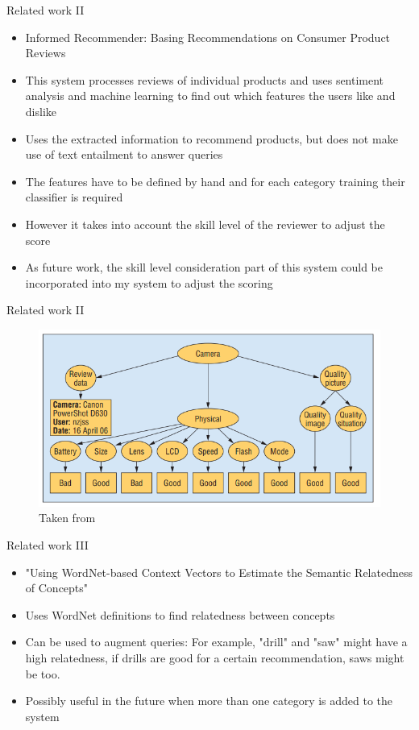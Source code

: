 \documentclass{beamer}
\begin{document}
\begin{frame}{Related work II}
    \begin{itemize}
        \item Informed Recommender: Basing Recommendations on Consumer Product Reviews \cite{aciar2007informed}
        \item This system processes reviews of individual products and uses sentiment analysis and machine learning to find out which features the users like and dislike
        \item Uses the extracted information to recommend products, but does not make use of text entailment to answer queries
        \item The features have to be defined by hand and for each category training their classifier is required
        \item However it takes into account the skill level of the reviewer to adjust the score
        \item As future work, the skill level consideration part of this system could be incorporated into my system to adjust the scoring
    \end{itemize}
\end{frame}

\begin{frame}{Related work II}
    \begin{figure}[htbp]
      \centering
      \includegraphics[scale=0.5]{textentailment2.PNG}
      \caption{Taken from \cite{aciar2007informed}}
    \end{figure}
\end{frame}

\begin{frame}{Related work III}
    \begin{itemize}
        \item "Using WordNet-based Context Vectors to Estimate the Semantic Relatedness of Concepts"\\
        \cite{patwardhan2006using}
        \item Uses WordNet definitions to find relatedness between concepts
        \item Can be used to augment queries: For example, "drill" and "saw" might have a high relatedness, if drills are good for a certain recommendation, saws might be too.
        \item Possibly useful in the future when more than one category is added to the system
    \end{itemize}
\end{frame}
\end{document}
